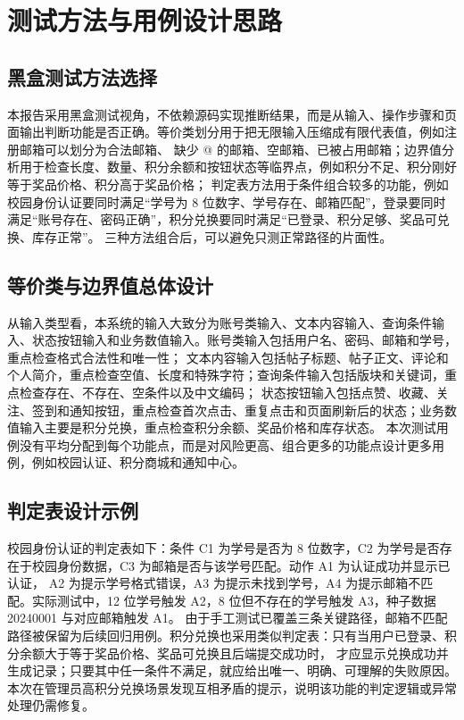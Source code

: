 \documentclass[bwprint]{report}
\begin{document}
\section{测试方法与用例设计思路}
\subsection{黑盒测试方法选择}
本报告采用黑盒测试视角，不依赖源码实现推断结果，而是从输入、操作步骤和页面输出判断功能是否正确。等价类划分用于把无限输入压缩成有限代表值，例如注册邮箱可以划分为合法邮箱、
缺少 @ 的邮箱、空邮箱、已被占用邮箱；边界值分析用于检查长度、数量、积分余额和按钮状态等临界点，例如积分不足、积分刚好等于奖品价格、积分高于奖品价格；
判定表方法用于条件组合较多的功能，例如校园身份认证要同时满足“学号为 8 位数字、学号存在、邮箱匹配”，登录要同时满足“账号存在、密码正确”，积分兑换要同时满足“已登录、积分足够、奖品可兑换、库存正常”。
三种方法组合后，可以避免只测正常路径的片面性。

\subsection{等价类与边界值总体设计}
从输入类型看，本系统的输入大致分为账号类输入、文本内容输入、查询条件输入、状态按钮输入和业务数值输入。账号类输入包括用户名、密码、邮箱和学号，重点检查格式合法性和唯一性；
文本内容输入包括帖子标题、帖子正文、评论和个人简介，重点检查空值、长度和特殊字符；查询条件输入包括版块和关键词，重点检查存在、不存在、空条件以及中文编码；
状态按钮输入包括点赞、收藏、关注、签到和通知按钮，重点检查首次点击、重复点击和页面刷新后的状态；业务数值输入主要是积分兑换，重点检查积分余额、奖品价格和库存状态。
本次测试用例没有平均分配到每个功能点，而是对风险更高、组合更多的功能点设计更多用例，例如校园认证、积分商城和通知中心。

\subsection{判定表设计示例}
校园身份认证的判定表如下：条件 C1 为学号是否为 8 位数字，C2 为学号是否存在于校园身份数据，C3 为邮箱是否与该学号匹配。动作 A1 为认证成功并显示已认证，
A2 为提示学号格式错误，A3 为提示未找到学号，A4 为提示邮箱不匹配。实际测试中，12 位学号触发 A2，8 位但不存在的学号触发 A3，种子数据 20240001 与对应邮箱触发 A1。
由于手工测试已覆盖三条关键路径，邮箱不匹配路径被保留为后续回归用例。积分兑换也采用类似判定表：只有当用户已登录、积分余额大于等于奖品价格、奖品可兑换且后端提交成功时，
才应显示兑换成功并生成记录；只要其中任一条件不满足，就应给出唯一、明确、可理解的失败原因。本次在管理员高积分兑换场景发现互相矛盾的提示，说明该功能的判定逻辑或异常处理仍需修复。
\end{document}

